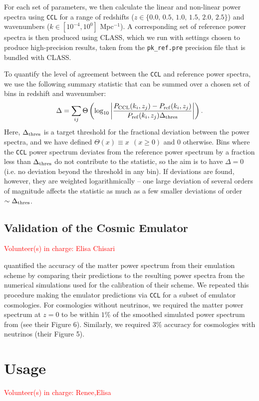 \documentclass[\docopts]{\docclass}
\newcommand{\vol}[1]{\textcolor{red}{Volunteer(s) in charge: #1}}
\newcommand{\ccl}{{\tt CCL}\xspace}
\begin{document}
For each set of parameters, we then calculate the linear and non-linear power spectra using \ccl for a range of redshifts ($z \in \{ 0.0,\, 0.5,\, 1.0,\, 1.5,\, 2.0,\, 2.5\}$) and wavenumbers ($k \in [10^{-4}, 10^0]$ Mpc$^{-1}$). A corresponding set of reference power spectra is then produced using CLASS, which we run with settings chosen to produce high-precision results, taken from the {\tt pk\_ref.pre} precision file that is bundled with CLASS.

To quantify the level of agreement between the \ccl and reference power spectra, we use the following summary statistic that can be summed over a chosen set of bins in redshift and wavenumber:
\begin{equation}
\Delta = \sum_{ij} \Theta \left ( \log_{10} \left | \frac{P_{\rm CCL}(k_i, z_j) - P_{\rm ref}(k_i, z_j)}{P_{\rm ref}(k_i, z_j) \Delta_{\rm thres}} \right | \right ).
\end{equation}
Here, $\Delta_{\rm thres}$ is a target threshold for the fractional deviation between the power spectra, and we have defined $\Theta(x) \equiv x ~~(x \ge 0)$ and $0$ otherwise. Bins where the \ccl power spectrum deviates from the reference power spectrum by a fraction less than $\Delta_{\rm thres}$ do not contribute to the statistic, so the aim is to have $\Delta = 0$ (i.e. no deviation beyond the threshold in any bin). If deviations are found, however, they are weighted logarithmically -- one large deviation of several orders of magnitude affects the statistic as much as a few smaller deviations of order $\sim \Delta_{\rm thres}$.

\subsection{Validation of the Cosmic Emulator}
\vol{Elisa Chisari}

\citet{Lawrence17} quantified the accuracy of the matter power spectrum from their emulation scheme by comparing their predictions to the resulting power spectra from the numerical simulations used for the calibration of their scheme. We repeated this procedure making the emulator predictions via \ccl for a subset of emulator cosmologies. For cosmologies without neutrinos, we required the matter power spectrum at $z=0$ to be within $1\%$ of the smoothed simulated power spectrum from \citet{Lawrence17} (see their Figure 6). Similarly, we required $3\%$ accuracy for cosmologies with neutrinos (their Figure 5). 


\section{Usage}
\vol{Renee,Elisa}
\end{document}
